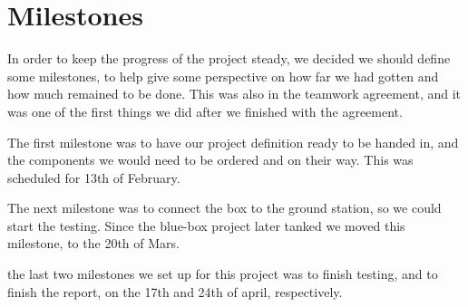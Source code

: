 \section{Milestones}
In order to keep the progress of the project steady, we decided we should define some milestones, to help give some perspective on how far we had gotten and how much remained to be done. This was also in the teamwork agreement, and it was one of the first things we did after we finished with the agreement.

The first milestone was to have our project definition ready to be handed in, and the components we would need to be ordered and on their way. This was scheduled for 13th of February. 

The next milestone was to connect the box to the ground station, so we could start the testing. Since the blue-box project later tanked we moved this milestone, to the 20th of Mars.

the last two milestones we set up for this project was to finish testing, and to finish the report, on the 17th and 24th of april, respectively.